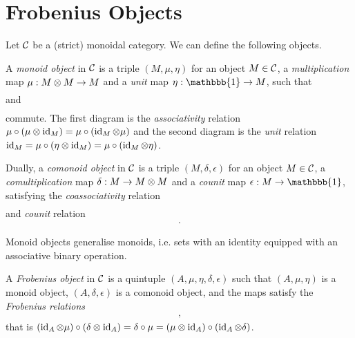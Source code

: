 \section{Frobenius Objects}
\label{sec:2.2}



Let $\mathcal{C}$ be a (strict) monoidal category. We can define the following objects.

\begin{definition}
    A \textit{monoid object} in $\mathcal{C}$ is a triple $(M,\mu,\eta)$ for an object $M \in \mathcal{C}$, a \textit{multiplication} map $\mu: M \otimes M \to M$ and a \textit{unit} map $\eta: \mathbbb{1} \to M$, such that
    \begin{gather*}
        
    \end{gather*}
    and
    \begin{gather*}
        
    \end{gather*}
    commute. The first diagram is the \textit{associativity} relation $\mu \circ (\mu \otimes \operatorname{id}_M) = \mu \circ (\operatorname{id}_M \otimes \mu)$ and the second diagram is the \textit{unit} relation $\operatorname{id}_M = \mu \circ (\eta \otimes \operatorname{id}_M) = \mu \circ (\operatorname{id}_M \otimes \eta)$.

    Dually, a \textit{comonoid object} in $\mathcal{C}$ is a triple $(M,\delta,\epsilon)$ for an object $M \in \mathcal{C}$, a \textit{comultiplication} map $\delta: M \to M \otimes M$ and a \textit{counit} map $\epsilon: M \to \mathbbb{1}$, satisfying the \textit{coassociativity} relation
    \begin{gather*}
        
    \end{gather*}
    and \textit{counit} relation
    \begin{gather*}
        .
    \end{gather*}
\end{definition}

Monoid objects generalise monoids, i.e. sets with an identity equipped with an associative binary operation.

\begin{definition}
    A \textit{Frobenius object} in $\mathcal{C}$ is a quintuple $(A,\mu,\eta,\delta,\epsilon)$ such that $(A,\mu,\eta)$ is a monoid object, $(A,\delta,\epsilon)$ is a comonoid object, and the maps satisfy the \textit{Frobenius relations}
    \begin{gather*}
        ,
    \end{gather*}
    that is $(\operatorname{id}_A \otimes \mu) \circ (\delta \otimes \operatorname{id}_A) = \delta \circ \mu = (\mu \otimes \operatorname{id}_A) \circ (\operatorname{id}_A \otimes \delta)$.
\end{definition}


